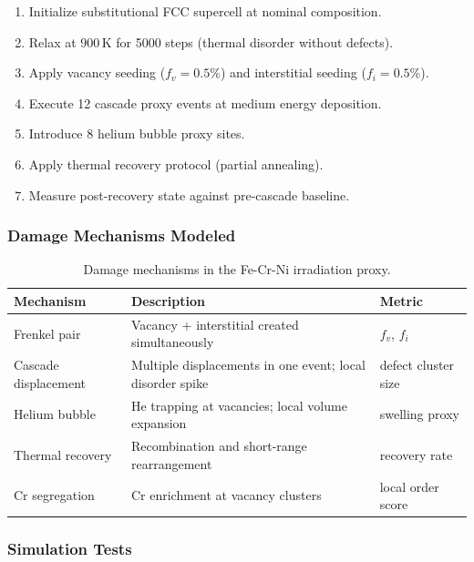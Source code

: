 \documentclass[12pt]{article}
\begin{document}
\begin{enumerate}[noitemsep]
	\item Initialize substitutional FCC supercell at nominal composition.
	\item Relax at 900\,K for 5000 steps (thermal disorder without defects).
	\item Apply vacancy seeding ($f_v = 0.5\%$) and interstitial seeding ($f_i = 0.5\%$).
	\item Execute 12 cascade proxy events at medium energy deposition.
	\item Introduce 8 helium bubble proxy sites.
	\item Apply thermal recovery protocol (partial annealing).
	\item Measure post-recovery state against pre-cascade baseline.
\end{enumerate}

\subsubsection*{Damage Mechanisms Modeled}

\begin{table}[H]
\centering
\caption{Damage mechanisms in the Fe-Cr-Ni irradiation proxy.}
\label{tab:fecrnisub_damage}
\begin{tabular}{p{}p{}p{}}
\toprule
\textbf{Mechanism} & \textbf{Description} & \textbf{Metric} \\
\midrule
Frenkel pair          & Vacancy + interstitial created simultaneously & $f_v$, $f_i$ \\
Cascade displacement  & Multiple displacements in one event; local disorder spike & defect cluster size \\
Helium bubble         & He trapping at vacancies; local volume expansion & swelling proxy \\
Thermal recovery      & Recombination and short-range rearrangement & recovery rate \\
Cr segregation        & Cr enrichment at vacancy clusters            & local order score \\
\bottomrule
\end{tabular}
\end{table}

\subsubsection*{Simulation Tests}
\end{document}
